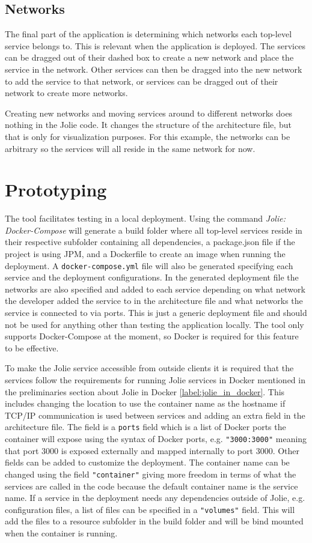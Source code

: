 \subsection{Networks}
The final part of the application is determining which networks each top-level service belongs to. This is relevant when the application is deployed.
The services can be dragged out of their dashed box to create a new network and place the service in the network.
Other services can then be dragged into the new network to add the service to that network, or services can be dragged out of their network to create more networks.

Creating new networks and moving services around to different networks does nothing in the Jolie code. It changes the structure of the architecture file, but that is only for visualization purposes. 
For this example, the networks can be arbitrary so the services will all reside in the same network for now.

\section{Prototyping}
The tool facilitates testing in a local deployment. Using the command \textit{Jolie: Docker-Compose} will generate a build folder where all top-level services reside in their respective subfolder containing all dependencies, a package.json file if the project is using JPM, and a Dockerfile to create an image when running the deployment.
A \texttt{docker-compose.yml} file will also be generated specifying each service and the deployment configurations.
In the generated deployment file the networks are also specified and added to each service depending on what network the developer added the service to in the architecture file and what networks the service is connected to via ports.
This is just a generic deployment file and should not be used for anything other than testing the application locally.
The tool only supports Docker-Compose at the moment, so Docker is required for this feature to be effective.

To make the Jolie service accessible from outside clients it is required that the services follow the requirements for running Jolie services in Docker mentioned in the preliminaries section about Jolie in Docker \ref*{label:jolie_in_docker}.
This includes changing the location to use the container name as the hostname if TCP/IP communication is used between services and adding an extra field in the architecture file.
The field is a \texttt{ports} field which is a list of Docker ports the container will expose using the syntax of Docker ports, e.g. \texttt{"3000:3000"} meaning that port 3000 is exposed externally and mapped internally to port 3000.
Other fields can be added to customize the deployment. The container name can be changed using the field \texttt{"container"} giving more freedom in terms of what the services are called in the code
because the default container name is the service name. If a service in the deployment needs any dependencies outside of Jolie, e.g. configuration files, a list of files can be specified in a \texttt{"volumes"} field.
This will add the files to a resource subfolder in the build folder and will be bind mounted when the container is running.

